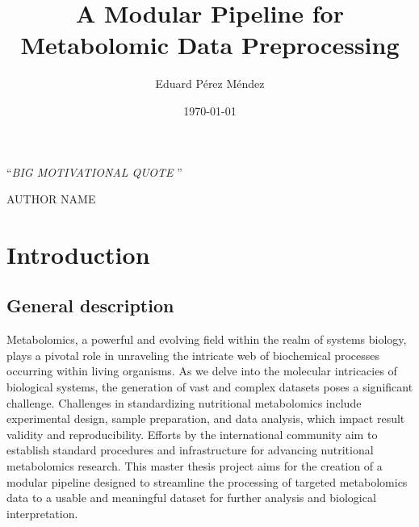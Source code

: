 \documentclass[ENG, BIB]{TFUOC}%
\title{A Modular Pipeline for Metabolomic Data Preprocessing}
\author{Eduard Pérez Méndez}
\date{\today}
\begin{document}
            
            \estructura
            
            \newpage\null\thispagestyle{empty}
            
            \vspace*{0.4\textheight} 
            
            \noindent\enquote{\itshape BIG MOTIVATIONAL QUOTE
            }\bigbreak 
            
            \hfill AUTHOR NAME
            
            \newpage
            
            
            \tableofcontents
            
\listoffigures

\listoftables



\chapter{Introduction}

\section{General description}

Metabolomics, a powerful and evolving field within the realm of systems biology, plays a pivotal role in unraveling the intricate web of biochemical processes occurring within living organisms. As we delve into the molecular intricacies of biological systems, the generation of vast and complex datasets poses a significant challenge. Challenges in standardizing nutritional metabolomics include experimental design, sample preparation, and data analysis, which impact result validity and reproducibility. Efforts by the international community aim to establish standard procedures and infrastructure for advancing nutritional metabolomics research. This master thesis project aims for the creation of a modular pipeline designed to streamline the processing of targeted metabolomics data to a usable and meaningful dataset for further analysis and biological interpretation.
\end{document}

